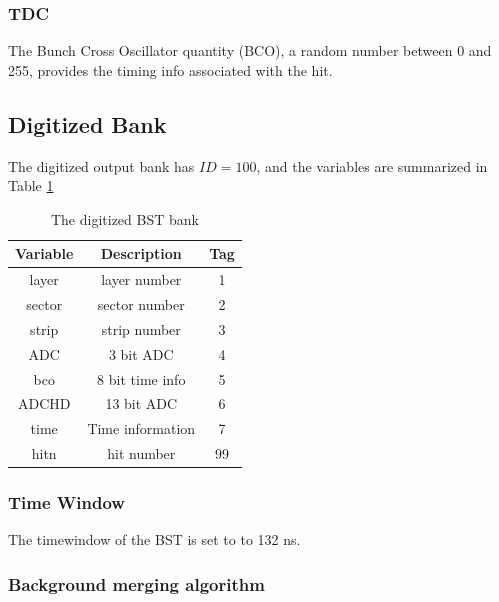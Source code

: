 \subsubsection{TDC}
The Bunch Cross Oscillator quantity (BCO), a random number between 0 and 255,
provides the timing info associated with the hit.

\subsection{Digitized Bank}
The digitized output bank has $ID=100$, and the variables are summarized in Table \ref{tab:bstBank}

\begin{table}[h]
	\begin{center}
		\begin{tabular}{| c | c | c |}
			\hline \hline
			Variable         & Description  & Tag  \\
			\hline
               layer  &                                      layer number  &    1   \\
              sector  &                                     sector number  &    2   \\
               strip  &                                      strip number  &    3   \\
                 ADC  &                                         3 bit ADC  &    4   \\
                 bco  &                                   8 bit time info  &    5   \\
               ADCHD  &                                        13 bit ADC  &    6   \\
                time  &                                  Time information  &    7   \\
                hitn  &                                        hit number  &   99   \\
			\hline \hline
		\end{tabular}
	\end{center}
	\caption{The digitized BST bank}\label{tab:bstBank}
\end{table}


\subsubsection{Time Window}
The timewindow of the BST is set to to 132 ns.

\subsubsection{Background merging algorithm}

